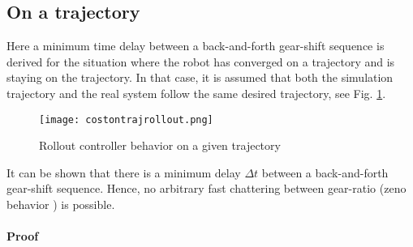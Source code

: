 \subsection{On a trajectory}
\label{sec:chat1}

Here a minimum time delay between a back-and-forth gear-shift sequence is derived for the situation where the robot has converged on a trajectory and is staying on the trajectory. In that case, it is assumed that both the simulation trajectory and the real system follow the same desired trajectory, see Fig. \ref{fig:costontrajrollout}.

\begin{figure}[H]
	\centering
		\texttt{[image: costontrajrollout.png]}
	\caption{Rollout controller behavior on a given trajectory}
	\label{fig:costontrajrollout}
\end{figure}

It can be shown that there is a minimum delay $\Delta t$ between a back-and-forth gear-shift sequence. Hence, no arbitrary fast chattering between gear-ratio (zeno behavior \cite{liberzon_switching_2003}) is possible. 

\paragraph{Proof} 

